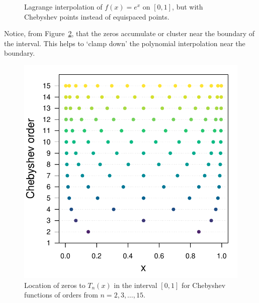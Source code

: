 \documentclass[11pt]{article}
\begin{document}
\begin{figure}[ht!]
\begin{minipage}{0.48\textwidth}
\end{minipage}
\caption{Lagrange interpolation of \(f(x) = e^x\) on \([0,1]\), but with Chebyshev points instead of equispaced points.}\label{fig::cheb_pts}
\end{figure}
%
Notice, from Figure~\ref{fig::cheb_zeros}, that the zeros accumulate or cluster near the boundary of the interval. This helps to `clamp down' the polynomial interpolation near the boundary.
%
\begin{figure}[ht!]\centering

\begin{minipage}[c]{0.48\textwidth}
\includegraphics[width=\textwidth]{3_approximation/cheb_zeros.pdf}

\end{minipage}
\begin{minipage}[c]{0.48\textwidth}

\caption{Location of zeros to \(T_n(x)\) in the interval \([0, 1]\) for Chebyshev functions of orders from \(n=2, 3, \dots, 15\).}\label{fig::cheb_zeros}

\end{minipage}
\end{figure}


\end{document}
